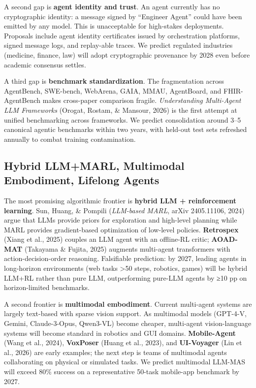 A second gap is \textbf{agent identity and trust}. An agent currently has no cryptographic identity: a message signed by ``Engineer Agent'' could have been emitted by any model. This is unacceptable for high-stakes deployments. Proposals include agent identity certificates issued by orchestration platforms, signed message logs, and replay-able traces. We predict regulated industries (medicine, finance, law) will adopt cryptographic provenance by 2028 even before academic consensus settles.

A third gap is \textbf{benchmark standardization}. The fragmentation across AgentBench, SWE-bench, WebArena, GAIA, MMAU, AgentBoard, and FHIR-AgentBench makes cross-paper comparison fragile. \emph{Understanding Multi-Agent LLM Frameworks} (Orogat, Rostam, \& Mansour, 2026) is the first attempt at unified benchmarking across frameworks. We predict consolidation around 3--5 canonical agentic benchmarks within two years, with held-out test sets refreshed annually to combat training contamination.

\subsection{Hybrid LLM+MARL, Multimodal Embodiment, Lifelong Agents}\label{hybrid-llmmarl-multimodal-embodiment-lifelong-agents}

The most promising algorithmic frontier is \textbf{hybrid LLM + reinforcement learning}. Sun, Huang, \& Pompili (\emph{LLM-based MARL}, arXiv 2405.11106, 2024) argue that LLMs provide priors for exploration and high-level planning while MARL provides gradient-based optimization of low-level policies. \textbf{Retrospex} (Xiang et al., 2025) couples an LLM agent with an offline-RL critic; \textbf{AOAD-MAT} (Takayama \& Fujita, 2025) augments multi-agent transformers with action-decision-order reasoning. Falsifiable prediction: by 2027, leading agents in long-horizon environments (web tasks \textgreater50 steps, robotics, games) will be hybrid LLM+RL rather than pure LLM, outperforming pure-LLM agents by ≥10 pp on horizon-limited benchmarks.

A second frontier is \textbf{multimodal embodiment}. Current multi-agent systems are largely text-based with sparse vision support. As multimodal models (GPT-4-V, Gemini, Claude-3-Opus, Qwen3-VL) become cheaper, multi-agent vision-language systems will become standard in robotics and GUI domains. \textbf{Mobile-Agent} (Wang et al., 2024), \textbf{VoxPoser} (Huang et al., 2023), and \textbf{UI-Voyager} (Lin et al., 2026) are early examples; the next step is teams of multimodal agents collaborating on physical or simulated tasks. We predict multimodal LLM-MAS will exceed 80\% success on a representative 50-task mobile-app benchmark by 2027.

